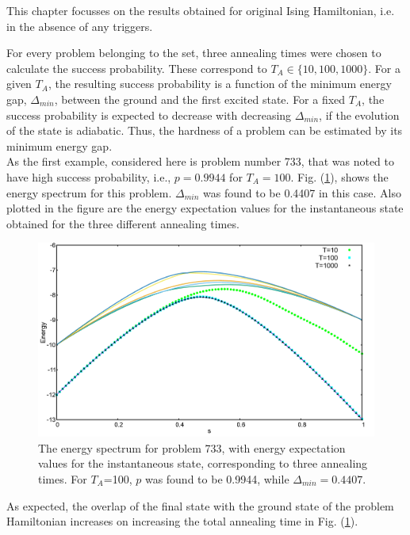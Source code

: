\documentclass[../main.tex]{subfiles}
\begin{document}
This chapter focusses on the results obtained for original Ising Hamiltonian, i.e. in the absence of any triggers. 


For every problem belonging to the set, three annealing times were chosen to calculate the success probability. These correspond to $T_A \in \{ 10,100,1000 \}$. For a given $T_A$, the resulting success probability is a function of the minimum energy gap, $\Delta_{min}$, between the ground and the first excited state. For a fixed $T_A$, the success probability is expected to decrease with decreasing $\Delta_{min}$, if the evolution of the state is adiabatic. Thus, the hardness of a problem can be estimated by its minimum energy gap.\\


As the first example, considered here is problem number 733, that was noted to have high success probability, i.e., $p=0.9944$ for $T_A=100$. Fig. (\ref{fig:o2}), shows the energy spectrum for this problem. $\Delta_{min}$ was found to be 0.4407 in this case.  Also plotted in the figure are the energy expectation values for the instantaneous state obtained for the three different annealing times.
\begin{figure}[H]
\centering 
\includegraphics[scale=0.24]{733_s12_O.png}
\caption{The energy spectrum for problem 733, with energy expectation values for the instantaneous state, corresponding to three annealing times. For $T_A$=100, $p$ was found to be 0.9944, while $\Delta_{min}=0.4407.$}
\label{fig:o2}
\end{figure}

As expected, the overlap of the final state with the ground state of the problem Hamiltonian increases on increasing the total annealing time in Fig. (\ref{fig:o2}).\\
\end{document}
